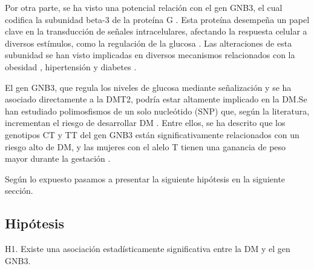 Por otra parte, se ha visto una potencial relación con el gen GNB3, el cual codifica la subunidad beta-3 de la proteína G \cite{Feng2019}. Esta proteína desempeña un papel clave en la transducción de señales intracelulares, afectando la respuesta celular a diversos estímulos, como la regulación de la glucosa \cite{Neves2002}. Las alteraciones de esta subunidad se han visto implicadas en diversos mecanismos relacionados con la obesidad \cite{Hsiao2013}, hipertensión y diabetes \cite{Siffert2005}.
 
El gen GNB3, que regula los niveles de glucosa mediante señalización y se ha asociado directamente a la DMT2\cite{Rizvi2016}, podría estar altamente implicado en la DM.Se han estudiado polimosfismos de un solo nucleótido (SNP) que, según la literatura, incrementan el riesgo de desarrollar DM \cite{ortega}. Entre ellos, se ha descrito que los genotipos CT y TT  del gen GNB3 están significativamente relacionados con un riesgo alto de DM, y las mujeres con el alelo T tienen una ganancia de peso mayor durante la gestación \cite{ortega}. 


Según lo expuesto pasamos a presentar la siguiente hipótesis en la siguiente sección.

\subsection{Hipótesis}

H1. Existe una asociación estadísticamente significativa entre la DM y el gen GNB3.